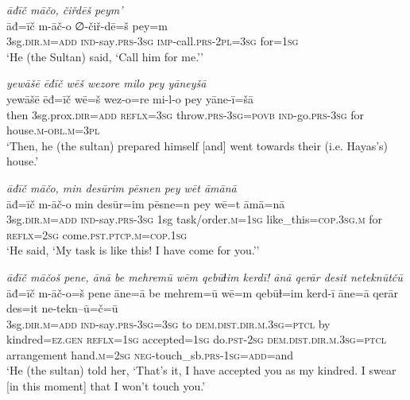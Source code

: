 \ea \label{ŽH.67}
\textit{āđīč māčo, čiřdēš peym’} \\ 
\gll āđ=īč m-āč-o ∅-čiř-dē=š pey=m \\ 
 3sg\textsc{.dir}\textsc{.m}\textsc{=add} \textsc{ind-}say\textsc{.prs}\textsc{-3sg} \textsc{imp-}call\textsc{.prs}\textsc{-2pl}\textsc{=3sg} for\textsc{=1sg} \\ 
\glt `He (the Sultan) said, ‘Call him for me.’'
\z 
 
\ea \label{ŽH.72}
\textit{yewāšē ēđīč wēš wezore milo pey yāneyšā} \\ 
\gll yewāšē ēđ=īč wē=š wez-o=re mi-l-o pey yāne-ī=šā \\ 
 then 3sg.prox\textsc{.dir}\textsc{=add} \textsc{reflx}\textsc{=3sg} throw\textsc{.prs}\textsc{-3sg}\textsc{=\textsc{povb}} \textsc{ind-}go\textsc{.prs}\textsc{-3sg} for house\textsc{.m}\textsc{-obl}\textsc{.m}\textsc{=3pl} \\ 
\glt `Then, he (the sultan) prepared himself [and] went towards their (i.e. Hayas’s) house.'
\z 
 
\ea \label{ŽH.78}
\textit{āđīč māčo, min desūrim pēsnen pey wēt āmānā} \\ 
\gll āđ=īč m-āč-o min desūr=im pēsne=n pey wē=t āmā=nā \\ 
 3sg\textsc{.dir}\textsc{.m}\textsc{=add} \textsc{ind-}say\textsc{.prs}\textsc{-3sg} 1sg task/order\textsc{.m}\textsc{=1sg} like\_this\textsc{=cop}\textsc{.3sg}\textsc{.m} for \textsc{reflx}\textsc{=\textsc{2sg}} come\textsc{.pst}\textsc{.ptcp}\textsc{.m}\textsc{=cop}\textsc{.1sg} \\ 
\glt `He said, ‘My task is like this! I have come for you.’'
\z 
 
\ea \label{ŽH.103}
\textit{āđīč māčoš pene, ānā be mehremū wēm qebūɫim kerdī! ānā qerār desit neteknūtčū} \\ 
\gll āđ=īč m-āč-o=š pene āne=ā be mehrem=ū wē=m qebūɫ=im kerd-ī āne=ā qerār des=it ne-tekn--ū=č=ū \\ 
 3sg\textsc{.dir}\textsc{.m}\textsc{=add} \textsc{ind-}say\textsc{.prs}\textsc{-3sg}\textsc{=3sg} to \textsc{dem.dist}\textsc{.dir}\textsc{.m}\textsc{.3sg}=\textsc{ptcl} by kindred\textsc{=ez}\textsc{.gen} \textsc{reflx}\textsc{=1sg} accepted\textsc{=1sg} do\textsc{.pst}-\textsc{2sg} \textsc{dem.dist}\textsc{.dir}\textsc{.m}\textsc{.3sg}=\textsc{ptcl} arrangement hand\textsc{.m}\textsc{=\textsc{2sg}} \textsc{neg-}touch\_sb\textsc{.prs}\textsc{-1sg}\textsc{=add}=and \\ 
\glt `He (the sultan) told her, ‘That’s it, I have accepted you as my kindred. I swear [in this moment] that I won’t touch you.'
\z 
 
